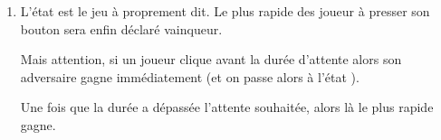 \documentclass[letterpaper,10pt,french]{sphinxmanual}
\begin{document}
\begin{enumerate}
\item {} 
L’état  est le jeu à proprement dit. Le plus rapide des
joueur à presser son bouton sera enfin déclaré vainqueur.

%
\begin{sphinxVerbatim}[commandchars=\\\{\}]
               
\end{sphinxVerbatim}

Mais attention, si un joueur clique avant la durée d’attente alors
son adversaire gagne immédiatement (et on passe alors à l’état ).

%
\begin{sphinxVerbatim}[commandchars=\\\{\}]
           
             
                  
                  
             
                  
                  
\end{sphinxVerbatim}

Une fois que la durée a dépassée l’attente souhaitée, alors là
le plus rapide gagne.

%
\begin{sphinxVerbatim}[commandchars=\\\{\}]
           
             
                  
                  
             
                  
                  
\end{sphinxVerbatim}


\end{enumerate}
\end{document}

